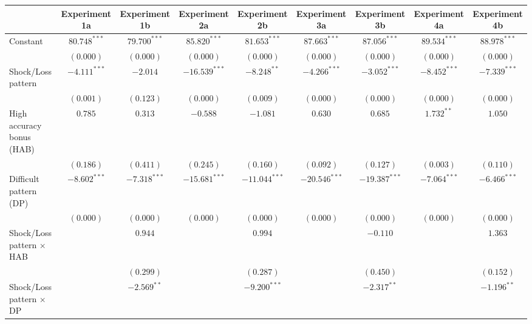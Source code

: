 
\begin{table}
\begin{center}
\begin{tabular}{l c c c c c c c c}
\hline
 & Experiment 1a & Experiment 1b & Experiment 2a & Experiment 2b & Experiment 3a & Experiment 3b & Experiment 4a & Experiment 4b \\
\hline
Constant                        & $80.748^{***}$ & $79.700^{***}$ & $85.820^{***}$  & $81.653^{***}$  & $87.663^{***}$  & $87.056^{***}$  & $89.534^{***}$ & $88.978^{***}$ \\
                                & $(0.000)$      & $(0.000)$      & $(0.000)$       & $(0.000)$       & $(0.000)$       & $(0.000)$       & $(0.000)$      & $(0.000)$      \\
Shock/Loss pattern              & $-4.111^{***}$ & $-2.014$       & $-16.539^{***}$ & $-8.248^{**}$   & $-4.266^{***}$  & $-3.052^{***}$  & $-8.452^{***}$ & $-7.339^{***}$ \\
                                & $(0.001)$      & $(0.123)$      & $(0.000)$       & $(0.009)$       & $(0.000)$       & $(0.000)$       & $(0.000)$      & $(0.000)$      \\
High accuracy bonus (HAB)       & $0.785$        & $0.313$        & $-0.588$        & $-1.081$        & $0.630$         & $0.685$         & $1.732^{**}$   & $1.050$        \\
                                & $(0.186)$      & $(0.411)$      & $(0.245)$       & $(0.160)$       & $(0.092)$       & $(0.127)$       & $(0.003)$      & $(0.110)$      \\
Difficult pattern (DP)          & $-8.602^{***}$ & $-7.318^{***}$ & $-15.681^{***}$ & $-11.044^{***}$ & $-20.546^{***}$ & $-19.387^{***}$ & $-7.064^{***}$ & $-6.466^{***}$ \\
                                & $(0.000)$      & $(0.000)$      & $(0.000)$       & $(0.000)$       & $(0.000)$       & $(0.000)$       & $(0.000)$      & $(0.000)$      \\
Shock/Loss pattern $\times$ HAB &                & $0.944$        &                 & $0.994$         &                 & $-0.110$        &                & $1.363$        \\
                                &                & $(0.299)$      &                 & $(0.287)$       &                 & $(0.450)$       &                & $(0.152)$      \\
Shock/Loss pattern $\times$ DP  &                & $-2.569^{**}$  &                 & $-9.200^{***}$  &                 & $-2.317^{**}$   &                & $-1.196^{**}$  \\

\end{tabular}
\end{center}
\end{table}
